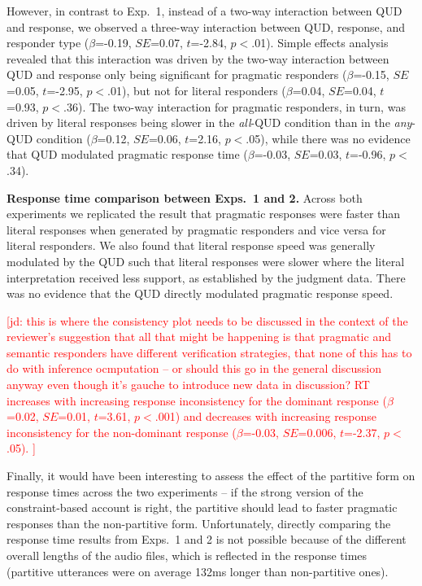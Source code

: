 \documentclass[10pt,letterpaper]{article}
\newcommand{\jd}[1]{\textcolor{Red}{[jd: #1]}}
\begin{document}
However, in contrast to Exp.~1, instead of a two-way interaction between QUD and response, we observed a three-way interaction between QUD, response, and responder type ($\beta$=-0.19, $SE$=0.07, $t$=-2.84, $p$$<$.01). Simple effects analysis revealed that this interaction was driven by the two-way interaction between QUD and response only being significant for pragmatic responders ($\beta$=-0.15, $SE$=0.05, $t$=-2.95, $p$$<$.01), but not for literal responders ($\beta$=0.04, $SE$=0.04, $t$=0.93, $p$$<$.36).  The two-way interaction for pragmatic responders, in turn, was driven by literal responses being slower in the \emph{all}-QUD condition than in the \emph{any}-QUD condition  ($\beta$=0.12, $SE$=0.06, $t$=2.16, $p$$<$.05), while there was no evidence that QUD modulated pragmatic response time  ($\beta$=-0.03, $SE$=0.03, $t$=-0.96, $p$$<$.34).

\noindent \textbf{Response time comparison between Exps.~1 and 2.} Across both experiments we replicated the result that pragmatic responses were faster than literal responses when generated by pragmatic responders and vice versa for literal responders. 
We also found that literal response speed was generally modulated by the QUD such that literal responses were slower where the literal interpretation received less support, as established by the judgment data. There was no evidence that the QUD directly modulated pragmatic response speed.

\jd{this is where the consistency plot needs to be discussed in the context of the reviewer's suggestion that all that might be happening is that pragmatic and semantic responders have different verification strategies, that none of this has to do with inference ocmputation -- or should this go in the general discussion anyway even though it's gauche to introduce new data in discussion? RT increases with increasing response inconsistency for the dominant response  ($\beta$=0.02, $SE$=0.01, $t$=3.61, $p$$<$.001) and decreases with increasing response inconsistency for the non-dominant response  ($\beta$=-0.03, $SE$=0.006, $t$=-2.37, $p$$<$.05). }

Finally, it would have been interesting to assess the effect of the partitive form on response times across the two experiments -- if the strong version of the constraint-based account is right, the partitive should lead to faster pragmatic responses than the non-partitive form. Unfortunately, directly comparing the response time results from Exps.~1 and 2 is not  possible because of the different overall lengths of the audio files, which is reflected in the response times (partitive utterances were on average 132ms longer than non-partitive ones).
\end{document}
